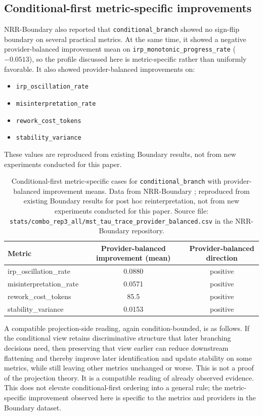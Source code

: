 \documentclass[11pt,a4paper]{article}
\begin{document}
\subsection{Conditional-first metric-specific improvements}

NRR-Boundary \cite{saito2026boundary} also reported that \texttt{conditional\_branch} showed no sign-flip boundary on several practical metrics. At the same time, it showed a negative provider-balanced improvement mean on \texttt{irp\_monotonic\_progress\_rate} ($-0.0513$), so the profile discussed here is metric-specific rather than uniformly favorable. It also showed provider-balanced improvements on:
\begin{itemize}
  \item \texttt{irp\_oscillation\_rate}
  \item \texttt{misinterpretation\_rate}
  \item \texttt{rework\_cost\_tokens}
  \item \texttt{stability\_variance}
\end{itemize}

These values are reproduced from existing Boundary results, not from new experiments conducted for this paper.

\begin{table}[h]
\centering
\small
\begin{tabular}{p{4.3cm}cc}
\toprule
Metric & Provider-balanced improvement (mean) & Provider-balanced direction \\
\midrule
irp\_oscillation\_rate & 0.0880 & positive \\
misinterpretation\_rate & 0.0571 & positive \\
rework\_cost\_tokens & 85.5 & positive \\
stability\_variance & 0.0153 & positive \\
\bottomrule
\end{tabular}
\caption{Conditional-first metric-specific cases for \texttt{conditional\_branch} with provider-balanced improvement means. Data from NRR-Boundary \cite{saito2026boundary}; reproduced from existing Boundary results for post hoc reinterpretation, not from new experiments conducted for this paper. Source file: \texttt{stats/combo\_rep3\_all/mst\_tau\_trace\_provider\_balanced.csv} in the NRR-Boundary repository.}
\label{tab:boundary_conditional_first}
\end{table}

A compatible projection-side reading, again condition-bounded, is as follows. If the conditional view retains discriminative structure that later branching decisions need, then preserving that view earlier can reduce downstream flattening and thereby improve later identification and update stability on some metrics, while still leaving other metrics unchanged or worse. This is not a proof of the projection theory. It is a compatible reading of already observed evidence.
This does not elevate conditional-first ordering into a general rule; the metric-specific improvement observed here is specific to the metrics and providers in the Boundary dataset.
\end{document}
